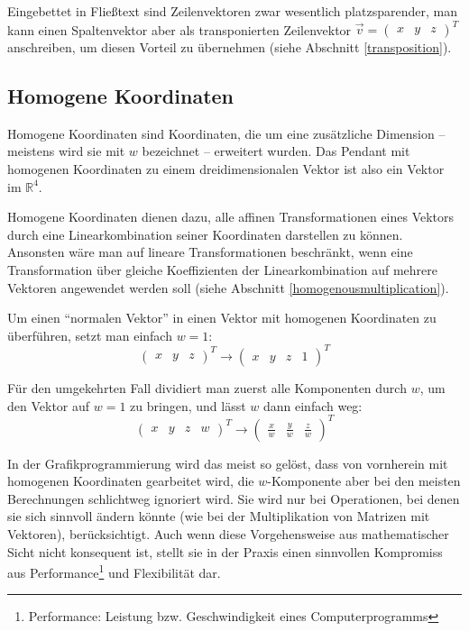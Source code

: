 Eingebettet in Fließtext sind Zeilenvektoren zwar wesentlich platzsparender, man kann einen Spaltenvektor aber als transponierten Zeilenvektor $\vec{v} = \begin{pmatrix} x & y & z \end{pmatrix}^T$ anschreiben, um diesen Vorteil zu übernehmen (siehe Abschnitt \ref{transposition}).


\subsection{Homogene Koordinaten}
Homogene Koordinaten sind Koordinaten, die um eine zusätzliche Dimension -- meistens wird sie mit $w$ bezeichnet -- erweitert wurden. Das Pendant mit homogenen Koordinaten zu einem dreidimensionalen Vektor ist also ein Vektor im $\mathbb{R}^4$.

Homogene Koordinaten dienen dazu, alle affinen Transformationen eines Vektors durch eine Linearkombination seiner Koordinaten darstellen zu können. Ansonsten wäre man auf lineare Transformationen beschränkt, wenn eine Transformation über gleiche Koeffizienten der Linearkombination auf mehrere Vektoren angewendet werden soll (siehe Abschnitt \ref{homogenousmultiplication}).

Um einen \enquote{normalen Vektor} in einen Vektor mit homogenen Koordinaten zu überführen, setzt man einfach $w = 1$:
\begin{equation}
 \begin{pmatrix} x & y & z \end{pmatrix}^T \rightarrow \begin{pmatrix} x & y & z & 1 \end{pmatrix}^T
\end{equation}

Für den umgekehrten Fall dividiert man zuerst alle Komponenten durch $w$, um den Vektor auf $w = 1$ zu bringen, und lässt $w$ dann einfach weg:
\begin{equation}
 \begin{pmatrix} x & y & z & w \end{pmatrix}^T \rightarrow \begin{pmatrix} \frac{x}{w} & \frac{y}{w} & \frac{z}{w} \end{pmatrix}^T
\end{equation}

In der Grafikprogrammierung wird das meist so gelöst, dass von vornherein mit homogenen Koordinaten gearbeitet wird, die $w$-Komponente aber bei den meisten Berechnungen schlichtweg ignoriert wird. Sie wird nur bei Operationen, bei denen sie sich sinnvoll ändern könnte (wie bei der Multiplikation von Matrizen mit Vektoren), berücksichtigt. Auch wenn diese Vorgehensweise aus mathematischer Sicht nicht konsequent ist, stellt sie in der Praxis einen sinnvollen Kompromiss aus Performance\footnote{Performance: Leistung bzw. Geschwindigkeit eines Computerprogramms} und Flexibilität dar.

